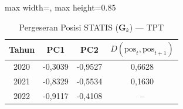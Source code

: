\begin{table}[H]
\centering
\caption{Pergeseran Posisi STATIS ($\mathbf{G}_k$) --- TPT} \label{tab:sample1jarak_statis_loading_tpt}
\begin{adjustbox}{max width=\textwidth, max height=0.85\textheight}
\begin{tabular}{|c|c|c|c|}
\hline
\textbf{Tahun} & \textbf{PC1} & \textbf{PC2} & \textbf{$D(\text{pos}_t, \text{pos}_{t+1})$} \\
\hline
2020 & -0,3039 & -0,9527 & 0,6628 \\
2021 & -0,8329 & -0,5534 & 0,1630 \\
2022 & -0,9117 & -0,4108 & -- \\
\hline
\end{tabular}
\end{adjustbox}
\end{table}